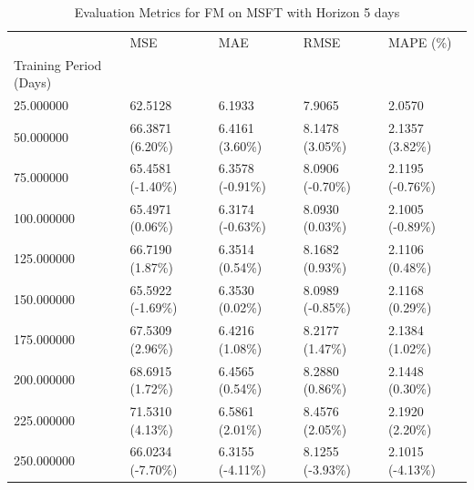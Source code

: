 \begin{table}
\caption{Evaluation Metrics for FM on MSFT with Horizon 5 days}
\label{tab:fm_MSFT_h5_metrics}
\begin{tabular}{lllll}
\toprule
 & MSE & MAE & RMSE & MAPE (\%) \\
Training Period (Days) &  &  &  &  \\
\midrule
25.000000 & 62.5128 & 6.1933 & 7.9065 & 2.0570 \\
50.000000 & 66.3871 (6.20\%) & 6.4161 (3.60\%) & 8.1478 (3.05\%) & 2.1357 (3.82\%) \\
75.000000 & 65.4581 (-1.40\%) & 6.3578 (-0.91\%) & 8.0906 (-0.70\%) & 2.1195 (-0.76\%) \\
100.000000 & 65.4971 (0.06\%) & 6.3174 (-0.63\%) & 8.0930 (0.03\%) & 2.1005 (-0.89\%) \\
125.000000 & 66.7190 (1.87\%) & 6.3514 (0.54\%) & 8.1682 (0.93\%) & 2.1106 (0.48\%) \\
150.000000 & 65.5922 (-1.69\%) & 6.3530 (0.02\%) & 8.0989 (-0.85\%) & 2.1168 (0.29\%) \\
175.000000 & 67.5309 (2.96\%) & 6.4216 (1.08\%) & 8.2177 (1.47\%) & 2.1384 (1.02\%) \\
200.000000 & 68.6915 (1.72\%) & 6.4565 (0.54\%) & 8.2880 (0.86\%) & 2.1448 (0.30\%) \\
225.000000 & 71.5310 (4.13\%) & 6.5861 (2.01\%) & 8.4576 (2.05\%) & 2.1920 (2.20\%) \\
250.000000 & 66.0234 (-7.70\%) & 6.3155 (-4.11\%) & 8.1255 (-3.93\%) & 2.1015 (-4.13\%) \\
\bottomrule
\end{tabular}
\end{table}
